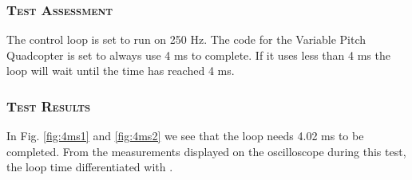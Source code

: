 \subsubsection*{\textsc{\medium Test Assessment}}
The control loop is set to run on 250 Hz. The code for the Variable Pitch Quadcopter is set to always use 4 ms to complete. If it uses less than 4 ms the loop will wait until the time has reached 4 ms.

\subsubsection*{\textsc{\medium Test Results}}
In Fig. \ref{fig:4ms1} and \ref{fig:4ms2} we see that the loop needs 4.02 ms to be completed. From the measurements displayed on the oscilloscope during this test, the loop time differentiated with .

